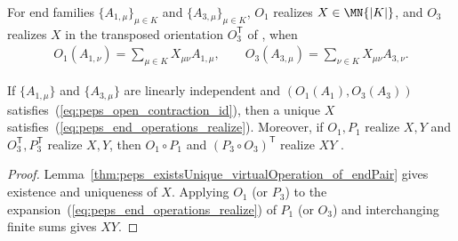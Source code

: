 \begin{definition}
    \label{def:peps_end_operations_realizing_virtual_matrix}
    \leanok
    For end families $\{A_{1,\mu}\}_{\mu\in K}$ and $\{A_{3,\mu}\}_{\mu\in K}$,
    $O_1$ realizes $X\in\MN{|K|}$, and $O_3$ realizes $X$ in the transposed
    orientation $O_3^{\mathsf T}$ of \cite[Lemma~5]{Molnar2018NormalPEPS}, when
    \begin{align}
        O_1(A_{1,\nu})
        =\sum_{\mu\in K}X_{\mu\nu}A_{1,\mu},
        \qquad
        O_3(A_{3,\mu})
        =\sum_{\nu\in K}X_{\mu\nu}A_{3,\nu}.
        \label{eq:peps_end_operations_realize}
    \end{align}
\end{definition}

\begin{lemma}
    \label{thm:peps_lemma5_end_operation_multiplication}
    \leanok
    If $\{A_{1,\mu}\}$ and $\{A_{3,\mu}\}$ are linearly independent and
    $(O_1(A_1),O_3(A_3))$ satisfies~(\ref{eq:peps_open_contraction_id}), then a
    unique $X$ satisfies~(\ref{eq:peps_end_operations_realize}). Moreover, if
    $O_1,P_1$ realize $X,Y$ and $O_3^{\mathsf T},P_3^{\mathsf T}$ realize $X,Y$,
    then $O_1\circ P_1$ and $(P_3\circ O_3)^{\mathsf T}$ realize $XY$
    \cite[Lemma~5]{Molnar2018NormalPEPS}.
\end{lemma}
\begin{proof}\leanok
    Lemma~\ref{thm:peps_existsUnique_virtualOperation_of_endPair} gives
    existence and uniqueness of $X$. Applying $O_1$ (or $P_3$) to the expansion~(\ref{eq:peps_end_operations_realize})
    of $P_1$ (or $O_3$) and interchanging finite sums gives $XY$.
\end{proof}

